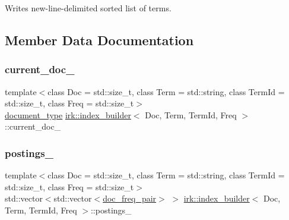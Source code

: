 Writes new-\/line-\/delimited sorted list of terms. 



\subsection{Member Data Documentation}
\mbox{\label{classirk_1_1index__builder_a5d40288309af28bfcfc48aed2e2d97d1}} 
\subsubsection{\texorpdfstring{current\+\_\+doc\+\_\+}{current\_doc\_}}
{\footnotesize\ttfamily template$<$class Doc  = std\+::size\+\_\+t, class Term  = std\+::string, class Term\+Id  = std\+::size\+\_\+t, class Freq  = std\+::size\+\_\+t$>$ \\
\mbox{\hyperlink{classirk_1_1index__builder_a4230ae91e9f84c95ee99b3607c6e952e}{document\+\_\+type}} \mbox{\hyperlink{classirk_1_1index__builder}{irk\+::index\+\_\+builder}}$<$ Doc, Term, Term\+Id, Freq $>$\+::current\+\_\+doc\+\_\+}

\mbox{\label{classirk_1_1index__builder_aa64eef56687fc708cbf0b1ec7342c45c}} 
\subsubsection{\texorpdfstring{postings\+\_\+}{postings\_}}
{\footnotesize\ttfamily template$<$class Doc  = std\+::size\+\_\+t, class Term  = std\+::string, class Term\+Id  = std\+::size\+\_\+t, class Freq  = std\+::size\+\_\+t$>$ \\
std\+::vector$<$std\+::vector$<$\mbox{\hyperlink{structirk_1_1index__builder_1_1doc__freq__pair}{doc\+\_\+freq\+\_\+pair}}$>$ $>$ \mbox{\hyperlink{classirk_1_1index__builder}{irk\+::index\+\_\+builder}}$<$ Doc, Term, Term\+Id, Freq $>$\+::postings\+\_\+}

\mbox{\label{classirk_1_1index__builder_abf42fb9c98133b69f1a201c50310e8f4}} 
